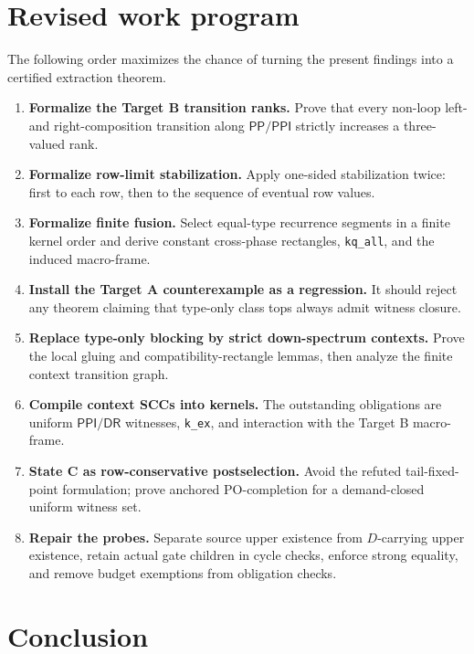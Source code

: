 \documentclass[11pt]{article}
\newcommand{\PP}{\mathsf{PP}}
\newcommand{\PPI}{\mathsf{PPI}}
\newcommand{\DR}{\mathsf{DR}}
\begin{document}
\section{Revised work program}

The following order maximizes the chance of turning the present findings into a certified
extraction theorem.

\begin{enumerate}
  \item \textbf{Formalize the Target B transition ranks.} Prove that every non-loop
        left- and right-composition transition along $\PP/\PPI$ strictly increases a
        three-valued rank.
  \item \textbf{Formalize row-limit stabilization.} Apply one-sided stabilization twice:
        first to each row, then to the sequence of eventual row values.
  \item \textbf{Formalize finite fusion.} Select equal-type recurrence segments in a finite
        kernel order and derive constant cross-phase rectangles, \texttt{kq\_all}, and the
        induced macro-frame.
  \item \textbf{Install the Target A counterexample as a regression.} It should reject any
        theorem claiming that type-only class tops always admit witness closure.
  \item \textbf{Replace type-only blocking by strict down-spectrum contexts.} Prove the
        local gluing and compatibility-rectangle lemmas, then analyze the finite context
        transition graph.
  \item \textbf{Compile context SCCs into kernels.} The outstanding obligations are uniform
        $\PPI/\DR$ witnesses, \texttt{k\_ex}, and interaction with the Target B macro-frame.
  \item \textbf{State C as row-conservative postselection.} Avoid the refuted tail-fixed-point
        formulation; prove anchored PO-completion for a demand-closed uniform witness set.
  \item \textbf{Repair the probes.} Separate source upper existence from $D$-carrying upper
        existence, retain actual gate children in cycle checks, enforce strong equality, and
        remove budget exemptions from obligation checks.
\end{enumerate}

\section{Conclusion}
\end{document}
